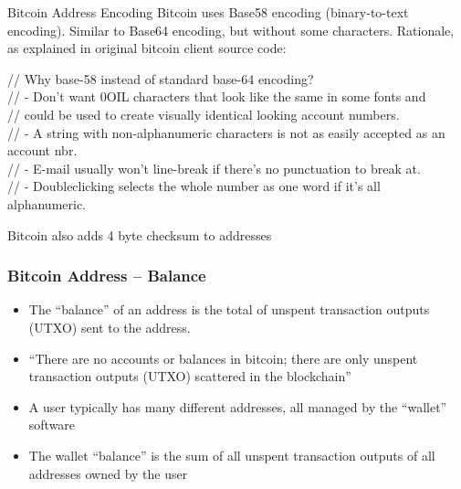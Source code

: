 \begin{note}{Bitcoin Address Encoding}
	Bitcoin uses Base58 encoding (binary-to-text encoding). Similar to Base64 encoding, but without some characters. Rationale, as explained in original bitcoin client source code:
	\begin{code}
		// Why base-58 instead of standard base-64 encoding?\\
		// - Don't want 0OIL characters that look like the same in some fonts and\\
		//   could be used to create visually identical looking account numbers.\\
		// - A string with non-alphanumeric characters is not as easily accepted as an account nbr.\\
		// - E-mail usually won't line-break if there's no punctuation to break at.\\
		// - Doubleclicking selects the whole number as one word if it's all\\alphanumeric.
	\end{code}
	Bitcoin also adds 4 byte checksum to addresses
\end{note}
\subsubsection{Bitcoin Address -- Balance}
\begin{itemize}
	\item The ``balance'' of an address is the total of unspent transaction outputs (UTXO) sent to the address.
	\item ``There are no accounts or balances in bitcoin; there are only unspent transaction outputs (UTXO) scattered in the blockchain''
	\item A user typically has many different addresses, all managed by the ``wallet'' software
	\item The wallet ``balance'' is the sum of all unspent transaction outputs of all addresses owned by the user
\end{itemize}
